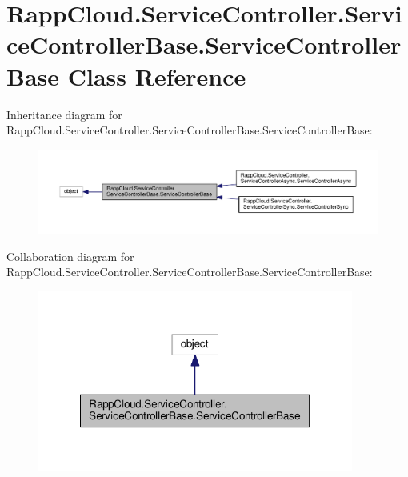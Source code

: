 \hypertarget{classRappCloud_1_1ServiceController_1_1ServiceControllerBase_1_1ServiceControllerBase}{\section{Rapp\-Cloud.\-Service\-Controller.\-Service\-Controller\-Base.\-Service\-Controller\-Base Class Reference}
\label{classRappCloud_1_1ServiceController_1_1ServiceControllerBase_1_1ServiceControllerBase}
}


Inheritance diagram for Rapp\-Cloud.\-Service\-Controller.\-Service\-Controller\-Base.\-Service\-Controller\-Base\-:
\nopagebreak
\begin{figure}[H]
\begin{center}
\leavevmode
\includegraphics[width=350pt]{classRappCloud_1_1ServiceController_1_1ServiceControllerBase_1_1ServiceControllerBase__inherit__graph}
\end{center}
\end{figure}


Collaboration diagram for Rapp\-Cloud.\-Service\-Controller.\-Service\-Controller\-Base.\-Service\-Controller\-Base\-:
\nopagebreak
\begin{figure}[H]
\begin{center}
\leavevmode
\includegraphics[width=294pt]{classRappCloud_1_1ServiceController_1_1ServiceControllerBase_1_1ServiceControllerBase__coll__graph}
\end{center}
\end{figure}
